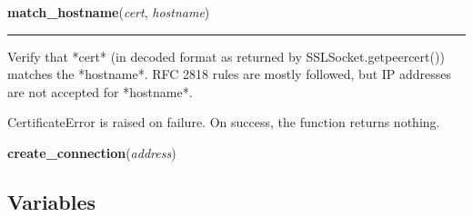    \vspace{0.5ex}

\hspace{.8\funcindent}\begin{boxedminipage}{\funcwidth}

    \raggedright \textbf{match\_hostname}(\textit{cert}, \textit{hostname})

    \vspace{-1.5ex}

    \rule{\textwidth}{0.5\fboxrule}
\setlength{\parskip}{2ex}
    Verify that *cert* (in decoded format as returned by 
    SSLSocket.getpeercert()) matches the *hostname*.  RFC 2818 rules are 
    mostly followed, but IP addresses are not accepted for *hostname*.

    CertificateError is raised on failure. On success, the function returns
    nothing.

\setlength{\parskip}{1ex}
    \end{boxedminipage}

    \label{lib:dropbox:create_connection}

    \vspace{0.5ex}

\hspace{.8\funcindent}\begin{boxedminipage}{\funcwidth}

    \raggedright \textbf{create\_connection}(\textit{address})

\setlength{\parskip}{2ex}
\setlength{\parskip}{1ex}
    \end{boxedminipage}



  \subsection{Variables}

